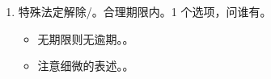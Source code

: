 \begin{enumerate}
\begin{enumerate}
\begin{enumerate}
\begin{enumerate}
\begin{itemize}
                                        。
                                \end{itemize}
                          \item 特殊法定解除/。合理期限内。1 个选项，问谁有。
                                \begin{itemize}
                                  \item 无期限则无逾期。。
                                  \item 注意细微的表述。。
                                \end{itemize}
                        \end{enumerate}


\end{enumerate}
\end{enumerate}
\end{enumerate}
